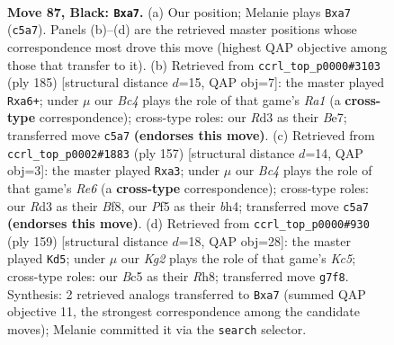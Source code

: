 \documentclass[11pt]{article}
\begin{document}
\clearpage

\begin{figure}[p]\centering
\begin{subfigure}{0.46\textwidth}\centering
\resizebox{\linewidth}{!}{%
\newchessgame
\chessboard[
  setfen={8/P5k1/R7/2b2p2/b4P2/3r4/7K/8 b - - 10 87},
  showmover=false,
  pgfstyle=straightmove, color=movearrow, markmove={c5-a7}
]}
\caption{}
\end{subfigure}\hfill
\begin{subfigure}{0.46\textwidth}\centering
\resizebox{\linewidth}{!}{%
\newchessgame
\chessboard[
  setfen={r7/4b3/P1K1P3/5k2/8/8/8/R7 b - - 2 93},
  showmover=false,
  pgfstyle=straightmove, color=movearrow, markmove={a8-a6}
]}
\caption{}
\end{subfigure}
\\[4pt]
\begin{subfigure}{0.46\textwidth}\centering
\resizebox{\linewidth}{!}{%
\newchessgame
\chessboard[
  setfen={5b2/7k/R7/8/2K4B/P3r3/8/8 b - - 1 79},
  showmover=false,
  pgfstyle=straightmove, color=movearrow, markmove={e3-a3}
]}
\caption{}
\end{subfigure}\hfill
\begin{subfigure}{0.46\textwidth}\centering
\resizebox{\linewidth}{!}{%
\newchessgame
\chessboard[
  setfen={7r/8/4R2P/6K1/2k1b3/8/8/8 b - - 19 80},
  showmover=false,
  pgfstyle=straightmove, color=movearrow, markmove={c4-d5}
]}
\caption{}
\end{subfigure}
\caption{\textbf{Move 87, Black: \texttt{Bxa7}.} (a) Our position; Melanie plays \texttt{Bxa7} (\texttt{c5a7}). Panels (b)--(d) are the retrieved master positions whose correspondence most drove this move (highest QAP objective among those that transfer to it). (b) Retrieved from \texttt{ccrl\_top\_p0000\#3103} (ply 185) [structural distance $d$=15, QAP obj=7]: the master played \texttt{Rxa6+}; under $\mu$ our \emph{Bc4} plays the role of that game's \emph{Ra1} (a \textbf{cross-type} correspondence); cross-type roles: our \emph{R}d3 as their \emph{B}e7; transferred move \texttt{c5a7} \textbf{(endorses this move)}. (c) Retrieved from \texttt{ccrl\_top\_p0002\#1883} (ply 157) [structural distance $d$=14, QAP obj=3]: the master played \texttt{Rxa3}; under $\mu$ our \emph{Bc4} plays the role of that game's \emph{Re6} (a \textbf{cross-type} correspondence); cross-type roles: our \emph{R}d3 as their \emph{B}f8, our \emph{P}f5 as their \emph{b}h4; transferred move \texttt{c5a7} \textbf{(endorses this move)}. (d) Retrieved from \texttt{ccrl\_top\_p0000\#930} (ply 159) [structural distance $d$=18, QAP obj=28]: the master played \texttt{Kd5}; under $\mu$ our \emph{Kg2} plays the role of that game's \emph{Kc5}; cross-type roles: our \emph{B}c5 as their \emph{R}h8; transferred move \texttt{g7f8}. Synthesis: 2 retrieved analogs transferred to \texttt{Bxa7} (summed QAP objective 11, the strongest correspondence among the candidate moves); Melanie committed it via the \texttt{search} selector.}
\label{fig:thought-m173}
\end{figure}
\end{document}
